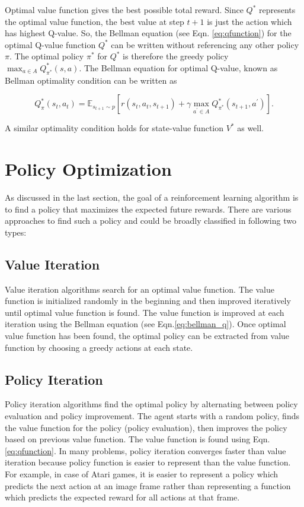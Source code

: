 Optimal value function gives the best possible total reward. Since $Q^*$ represents the optimal value function, the best value at step $t+1$ is just the action which has highest Q-value. So, the Bellman equation (see Eqn. \ref{eq:qfunction}) for the optimal Q-value function $Q^*$ can be written without referencing any other policy $\pi$. The optimal policy $\pi^*$ for $Q^*$ is therefore the greedy policy $\max_{a\in A} Q^*_{\pi^*}(s, a)$. The Bellman equation for optimal Q-value, known as Bellman optimality condition can be written as

\begin{equation}\label{eq:bellman_v}
Q^*_\pi(s_t, a_t) = \mathbb{E}_{s_{t+1}\sim p}[r(s_t,a_t,s_{t+1}) + \gamma \max_{a^\prime \in A} Q^*_{\pi^*}(s_{t+1}, a^\prime)].
\end{equation}

A similar optimality condition holds for state-value function $V^*$ as well.

\newpage
\section{Policy Optimization}

As discussed in the last section, the goal of a reinforcement learning algorithm is to find a policy that maximizes the expected future rewards. There are various approaches to find such a policy and could be broadly classified in following two types:

\subsection{Value Iteration}
Value iteration algorithms search for an optimal value function. The value function is initialized randomly in the beginning and then improved iteratively until optimal value function is found. The value function is improved at each iteration using the Bellman equation (see Eqn.\ref{eq:bellman_q}). Once optimal value function has been found, the optimal policy can be extracted from value function by choosing a greedy actions at each state. 

\subsection{Policy Iteration}
Policy iteration algorithms find the optimal policy by alternating between policy evaluation and policy improvement. The agent starts with a random policy, finds the value function for the policy (policy evaluation), then improves the policy based on previous value function. The value function is found using Eqn. \ref{eq:qfunction}. In many problems, policy iteration converges faster than value iteration because policy function is easier to represent than the value function. For example, in case of Atari games, it is easier to represent a policy which predicts the next action at an image frame rather than representing a function which predicts the expected reward for all actions at that frame.

